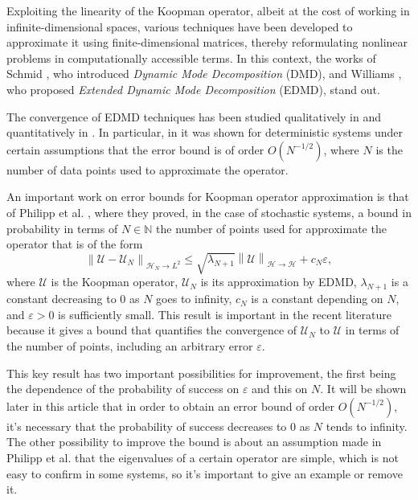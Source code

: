 \documentclass{article}
\newcommand{\N}{\mathbb{N}} %
\newcommand{\norm}[1]{\left\lVert#1\right\rVert} %
\newcommand{\eps}{\varepsilon} %
\renewcommand{\H}{\mathcal{H}}
\newcommand{\U}{\mathcal{U}}
\begin{document}
Exploiting the linearity of the Koopman operator, albeit at the cost of working in infinite-dimensional spaces, various techniques have been developed to approximate it using finite-dimensional matrices, thereby reformulating nonlinear problems in computationally accessible terms. In this context, the works of Schmid \cite{Schmid2008DynamicData}, who introduced \textit{Dynamic Mode Decomposition} (DMD), and Williams \cite{Williams2015ADecomposition}, who proposed \textit{Extended Dynamic Mode Decomposition} (EDMD), stand out.

The convergence of EDMD techniques has been studied qualitatively in \cite{Mezic2022OnOperator, Klus2016OnOperator, Williams2015ADecomposition} and quantitatively in \cite{Kohne2025boldsymbolLboldsymbolinftyDecomposition, Nuske2023Finite-DataControl, Philipp2023ErrorFramework}. In particular, in \cite{Zhang2022APredictions} it was shown for deterministic systems under certain assumptions that the error bound is of order $O(N^{-1/2})$, where $N$ is the number of data points used to approximate the operator.

An important work on error bounds for Koopman operator approximation is that of Philipp et al. \cite{Philipp2024ErrorOperator}, where they proved, in the case of stochastic systems, a bound in probability in terms of $N \in \N$ the number of points used for approximate the operator that is of the form
\[
\norm{\U-\U_N}_{\H_{N} \to L^2} \leq \sqrt{\lambda_{N+1}} \norm{\U}_{\H \to \H} + c_N \eps,
\]
where $\U$ is the Koopman operator, $\U_N$ is its approximation by EDMD, $\lambda_{N+1}$ is a constant decreasing to $0$ as $N$ goes to infinity, $c_N$ is a constant depending on $N$, and $\varepsilon > 0$ is sufficiently small. This result is important in the recent literature because it gives a bound that quantifies the convergence of $\U_N$ to $\U$ in terms of the number of points, including an arbitrary error $\varepsilon$.

This key result has two important possibilities for improvement, the first being the dependence of the probability of success on $\varepsilon$ and this on $N$. It will be shown later in this article that in order to obtain an error bound of order $O(N^{-1/2})$, it's necessary that the probability of success decreases to $0$ as $N$ tends to infinity. The other possibility to improve the bound is about an assumption made in Philipp et al. that the eigenvalues of a certain operator are simple, which is not easy to confirm in some systems, so it's important to give an example or remove it.
\end{document}

